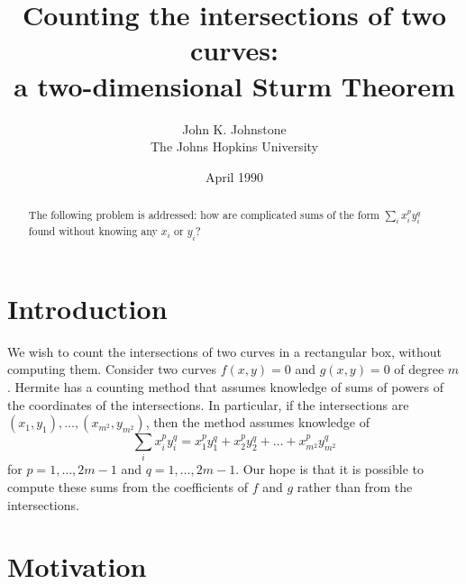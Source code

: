 


\renewenvironment{definition}{\begin{quote}{\bf Definition}\ \ \em}{\end{quote}}


\newcommand{\xii}{x_{i}}  
\newcommand{\xj}{x_{j}}
\newcommand{\yi}{y_{i}}
\newcommand{\yj}{y_{j}}
\renewcommand{\choose}[2]{(\stackrel{#1}{#2})}


\title{Counting the intersections of two curves:\\ a two-dimensional Sturm Theorem}
\author{John K. Johnstone \\ The Johns Hopkins University}
\date{April 1990}

\maketitle

\begin{abstract}
The following problem is addressed: how are complicated sums
of the form $\sum_{i} \xii^{p} \yi^{q}$ found without knowing any $\xii$ or $\yi$?
\end{abstract}

\section{Introduction}

We wish to count the intersections of two curves in a rectangular box,
without computing them.
Consider two curves $f(x,y) = 0$ and $g(x,y) = 0$ of degree $m$.
Hermite has a counting method that assumes knowledge of sums
of powers of the coordinates of the intersections.
In particular, if the intersections are 
$(x_{1},y_{1}), \ldots,(x_{m^{2}},y_{m^{2}})$,
then the method assumes knowledge of 
\[
	\sum_{i} x_{i}^{p}y_{i}^{q}
	= x_{1}^{p}y_{1}^{q} + x_{2}^{p}y_{2}^{q} + \ldots + 
	  x_{m^{2}}^{p}y_{m^{2}}^{q} 
\]
for $p = 1, \ldots, 2m-1$ and $q = 1, \ldots, 2m-1$.
Our hope is that it is possible to compute these sums from
the coefficients of $f$ and $g$ rather than from the intersections.

\section{Motivation}

